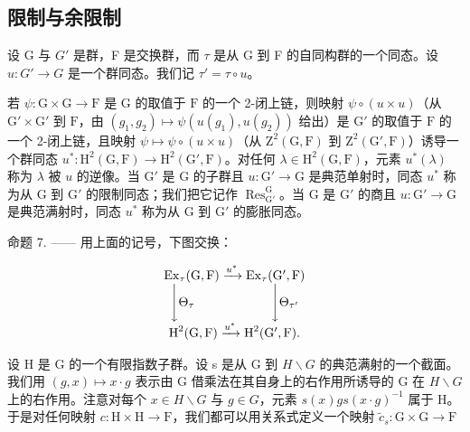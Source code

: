 \subsection{限制与余限制}

设 G 与 \(G'\) 是群，F 是交换群，而 \(\tau\) 是从 G 到 F 的自同构群的一个同态。设 \(u: G' \to G\) 是一个群同态。我们记 \(\tau' = \tau \circ u\)。

若 \(\psi : \mathrm{G} \times \mathrm{G} \to \mathrm{F}\) 是 \(\mathrm{G}\) 的取值于 \(\mathrm{F}\) 的一个 2-闭上链，则映射 \(\psi \circ (u \times u)\)（从 \(\mathrm{G}' \times \mathrm{G}'\) 到 \(\mathrm{F}\)，由 \((g_1, g_2) \mapsto \psi(u(g_1), u(g_2))\) 给出）是 \(\mathrm{G}'\) 的取值于 \(\mathrm{F}\) 的一个 2-闭上链，且映射 \(\psi \mapsto \psi \circ (u \times u)\)（从 \(\mathrm{Z}^2(\mathrm{G}, \mathrm{F})\) 到 \(\mathrm{Z}^2(\mathrm{G}', \mathrm{F})\)）诱导一个群同态 \(u^*: \mathrm{H}^2(\mathrm{G}, \mathrm{F}) \to \mathrm{H}^2(\mathrm{G}', \mathrm{F})\)。对任何 \(\lambda \in \mathrm{H}^2(\mathrm{G}, \mathrm{F})\)，元素 \(u^*(\lambda)\) 称为 \(\lambda\) 被 \(u\) 的逆像。当 \(\mathrm{G}'\) 是 \(\mathrm{G}\) 的子群且 \(u: \mathrm{G}' \to \mathrm{G}\) 是典范单射时，同态 \(u^*\) 称为从 \(\mathrm{G}\) 到 \(\mathrm{G}'\) 的限制同态；我们把它记作 \(\operatorname{Res}_{\mathrm{G}'}^{\mathrm{G}}\)。当 \(\mathrm{G}\) 是 \(\mathrm{G}'\) 的商且 \(u: \mathrm{G}' \to \mathrm{G}\) 是典范满射时，同态 \(u^*\) 称为从 \(\mathrm{G}\) 到 \(\mathrm{G}'\) 的膨胀同态。

命题 7. —— 用上面的记号，下图交换：

\[
\begin{array}{c} \operatorname{Ex} _ {\tau} (\mathrm{G}, \mathrm{F}) \xrightarrow {u ^ {*}} \operatorname{Ex} _ {\tau} (\mathrm{G} ^ {\prime}, \mathrm{F}) \\ \Biggl \downarrow \Theta_ {\tau} \qquad \qquad \qquad \Biggl \downarrow \Theta_ {\tau^ {\prime}} \\ \operatorname{H} ^ {2} (\mathrm{G}, \mathrm{F}) \xrightarrow {u ^ {*}} \operatorname{H} ^ {2} (\mathrm{G} ^ {\prime}, \mathrm{F})  . \end{array}
\]

设 H 是 G 的一个有限指数子群。设 s 是从 G 到 \(H\backslash G\) 的典范满射的一个截面。我们用 \((g,x)\mapsto x\cdot g\) 表示由 G 借乘法在其自身上的右作用所诱导的 G 在 \(H\backslash G\) 上的右作用。注意对每个 \(x\in H\backslash G\) 与 \(g\in G\)，元素 \(s(x)gs(x\cdot g)^{-1}\) 属于 H。于是对任何映射 \(c: \mathrm{H} \times \mathrm{H} \to \mathrm{F}\)，我们都可以用关系式定义一个映射 \(\widetilde{c}_s: \mathrm{G} \times \mathrm{G} \to \mathrm{F}\)


